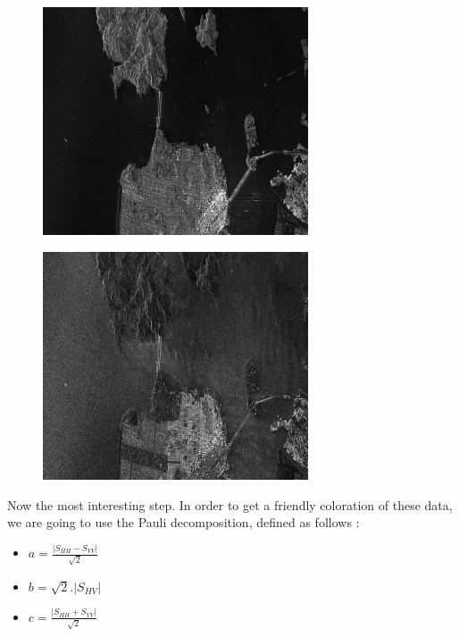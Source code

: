 \begin{figure}[!h]
\center
\includegraphics[width=0.7\textwidth]{../Art/SARImages/RSAT2_HV_Frisco.png}
\label{fig:hvfrisco}
\end{figure}

\begin{figure}[!h]
\center
\includegraphics[width=0.7\textwidth]{../Art/SARImages/RSAT2_VV_Frisco.png}
\label{fig:vvfrisco}
\end{figure}

Now the most interesting step. In order to get a friendly coloration of these
data, we are going to use the Pauli decomposition, defined as follows :

\begin{itemize}
\item  $a=\frac{|S_{HH}-S_{VV}|}{\sqrt{2}}$ 
									  
\item  $b=\sqrt{2}.|S_{HV}|$ 
									  
\item  $c=\frac{|S_{HH}+S_{VV}|}{\sqrt{2}}$ 
\end{itemize}

